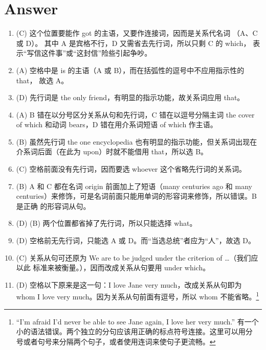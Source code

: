 \section{Answer}
\begin{enumerate}
\item (C) 这个位置要能作 got 的主语，又要作连接词，因而是关系代名词
  （A、C 或 D）。 其中 A 是宾格不行，D 又需省去先行词，所以只剩 C 的 which，
  表示“写信这件事”或“这封信”险些引起争吵。


\item (A) 空格中是 is 的主语（A 或 B），而在括弧性的逗号中不应用指示性的 that，
  故选 A。

\item (D) 先行词是 the only friend，有明显的指示功能，故关系词应用 that。

\item (A) B 错在以分号区分关系从句和先行词，C 错在以逗号分隔主词 the cover of which 和动词 bears，D 错在用介系词短语 of which 作主语。


\item  (B) 虽然先行词 the one encyclopedia 也有明显的指示功能，但关系词出现在介系词后面（在此为 upon）时就不能借用 that，所以选 B。

\item (C) 空格前面没有先行词，因而要选 whoever 这个省略先行词的关系词。

\item (B) A 和 C 都在名词 origin 前面加上了短语（many centuries ago 和 many
  centuries）来修饰，可是名词前面只能用单词的形容词来修饰，所以错误。B 是正确
  的形容词从句。

\item {} (D)  (B) 两个位置都省掉了先行词，所以只能选择 what。
\item (D) 空格前无先行词，只能选 A 或 D。而“当选总统”者应为“人”，故选 D。


\item (C) 关系从句可还原为 We are to be judged under the criterion of \ldots（我们应以此
  标准来被衡量。），因而改成关系从句要用 under which。


\item (D) 空格以下原来是这一句：I love Jane very much，改成关系从句即为 whom I
  love very much。因为关系从句前面有逗号，所以 whom 不能省略。\footnote{
    “I'm afraid I'd never be able to see Jane again, I love her very much.”
    有一个小的语法错误。两个独立的分句应该用正确的标点符号连接。这里可以用分
    号或者句号来分隔两个句子，或者使用连词来使句子更流畅。

}
\end{enumerate}
